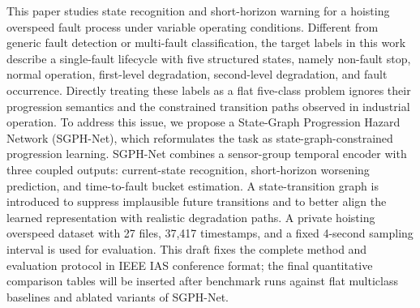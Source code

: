 This paper studies state recognition and short-horizon warning for a hoisting overspeed fault process under variable operating conditions. Different from generic fault detection or multi-fault classification, the target labels in this work describe a single-fault lifecycle with five structured states, namely non-fault stop, normal operation, first-level degradation, second-level degradation, and fault occurrence. Directly treating these labels as a flat five-class problem ignores their progression semantics and the constrained transition paths observed in industrial operation. To address this issue, we propose a State-Graph Progression Hazard Network (SGPH-Net), which reformulates the task as state-graph-constrained progression learning. SGPH-Net combines a sensor-group temporal encoder with three coupled outputs: current-state recognition, short-horizon worsening prediction, and time-to-fault bucket estimation. A state-transition graph is introduced to suppress implausible future transitions and to better align the learned representation with realistic degradation paths. A private hoisting overspeed dataset with 27 files, 37,417 timestamps, and a fixed 4-second sampling interval is used for evaluation. This draft fixes the complete method and evaluation protocol in IEEE IAS conference format; the final quantitative comparison tables will be inserted after benchmark runs against flat multiclass baselines and ablated variants of SGPH-Net.

